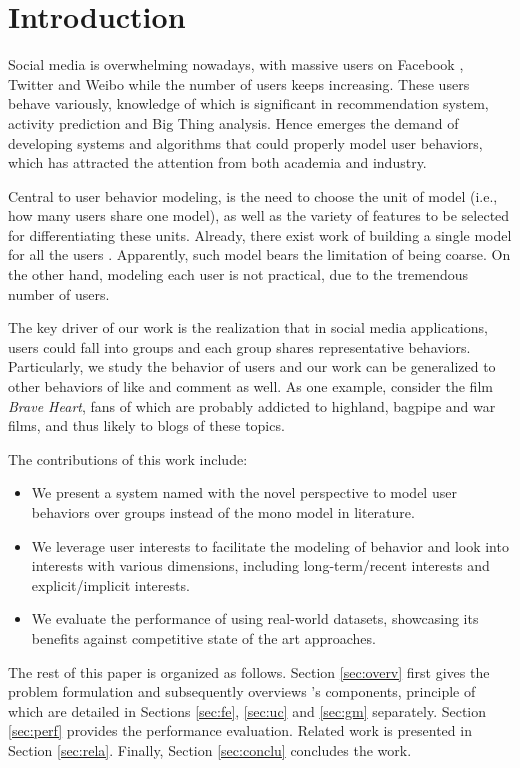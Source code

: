 \section{Introduction}
\label{sec:intro}

Social media is overwhelming nowadays, with massive users on Facebook , Twitter  and Weibo  while the number of users keeps increasing.
These users behave variously, knowledge of which is significant in recommendation system, activity prediction and Big Thing analysis.
Hence emerges the demand of developing systems and algorithms that could properly model user behaviors, which has attracted the attention from both academia and industry.

Central to user behavior modeling, is the need to choose the unit of model (i.e., how many users share one model), as well as the variety of features to be selected for differentiating these units.
Already, there exist work of building a single model for all the users .
Apparently, such model bears the limitation of being coarse.
On the other hand, modeling each user is not practical, due to the tremendous number of users.

The key driver of our work is the realization that in social media applications, users could fall into groups and each group shares representative behaviors.
Particularly, we study the \retg{} behavior of users and our work can be generalized to other behaviors of like and comment as well. 
As one example, consider the film \textit{Brave Heart}, fans of which are probably addicted to highland, bagpipe and war films, and thus likely to \ret{} blogs of these topics.

The contributions of this work include:
\begin{itemize}
\item We present a system named \sys{} with the novel perspective to model user behaviors over groups instead of the mono model in literature.
\item We leverage user interests to facilitate the modeling of \retg{} behavior and look into interests with various dimensions, including long-term/recent interests and explicit/implicit interests.
\item We evaluate the performance of \sys{} using real-world datasets, showcasing its benefits against competitive state of the art approaches.
\end{itemize}


The rest of this paper is organized as follows.
Section \ref{sec:overv} first gives the problem formulation and subsequently overviews \sys{}'s components, principle of which are detailed in Sections \ref{sec:fe}, \ref{sec:uc} and \ref{sec:gm} separately.
Section \ref{sec:perf} provides the performance evaluation.
Related work is presented in Section \ref{sec:rela}.
Finally, Section \ref{sec:conclu} concludes the work.











